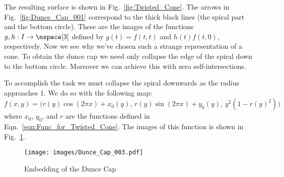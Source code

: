 \documentclass{book}                                                           %
\begin{document}
                \par\hfill\par
                \begin{minipage}[t]{0.54\textwidth}
                    The resulting surface is shown in
                    Fig.~\ref{fig:Twisted_Cone}. The arrows in
                    Fig.~\ref{fig:Dunce_Cap_001} correspond to the thick black
                    lines (the spiral part and the bottom circle). These are the
                    images of the functions $g,h:I\rightarrow\nspace[3]$ defined
                    by $g(t)=f(t,t)$ and $h(t)f(t,0)$, respectively. Now we see
                    why we've chosen such a strange representation of a cone. To
                    obtain the dunce cap we need only collapse the edge of the
                    spiral down to the bottom circle. Moreover we can achieve
                    this with zero self-intersections.
                \end{minipage}
                \hfill
                \par\vspace{2.5ex}
                To accomplish the task we must collapse the spiral downwards as
                the radius approaches 1. We do so with the following map:
                \begin{equation}
                    f(x,y)=\big(
                        r(y)\cos(2\pi{x})+x_{0}(y),\,
                        r(y)\sin(2\pi{x})+y_{0}(y),\,
                        y^{2}(1-r(y)^{2})
                    \big)
                \end{equation}
                where $x_{0}$, $y_{0}$, and $r$ are the functions defined in
                Eqn.~\ref{eqn:Func_for_Twisted_Cone}. The images of this
                function is shown in Fig.~\ref{fig:Dunce_Cap_003}.
                \begin{figure}[H]
                    \centering
                    \captionsetup{type=figure}
                    \texttt{[image: images/Dunce\_Cap\_003.pdf]}
                    \caption{Embedding of the Dunce Cap}
                    \label{fig:Dunce_Cap_003}
                \end{figure}
\end{document}
